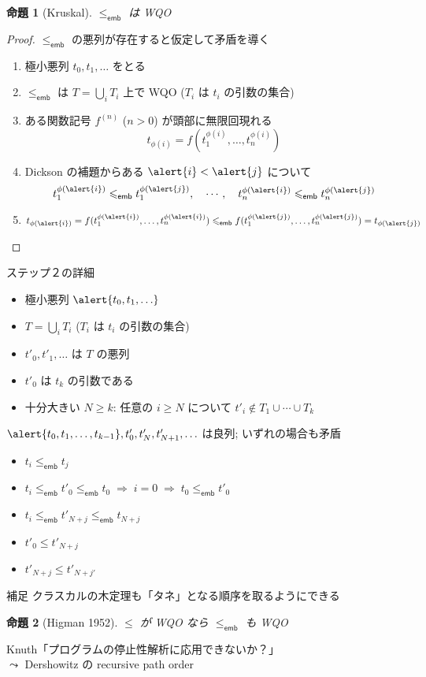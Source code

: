 \documentclass{beamer}
\newtheorem{prop}{命題}
\newcommand{\emb}{\mathsf{emb}}
\begin{document}
\begin{frame}
\begin{prop}[Kruskal]
$\leqslant_\emb$ は WQO
\end{prop}
\begin{proof}
$\leqslant_\emb$ の悪列が存在すると仮定して矛盾を導く
\begin{enumerate}
\itemsep 0.5em
\item 極小悪列 $t_0, t_1, \ldots$ をとる
\item 
\alert{$\leqslant_\emb$ は $T = \bigcup_i T_i$ 上で WQO} ($T_i$ は $t_i$ の引数の集合)

\item ある関数記号 $f^{(n)}$ ($n > 0$) が頭部に無限回現れる
\[
t_{\phi(i)} = f(t_{1}^{\phi(i)}, \ldots, t_{n}^{\phi(i)})
\]

\item Dickson の補題からある $\alert{i} < \alert{j}$ について
\[
t_{1}^{\phi(\alert{i})} \leqslant_\emb t_{1}^{\phi(\alert{j})},
\quad
\cdots,
\quad
t_{n}^{\phi(\alert{i})} \leqslant_\emb t_{n}^{\phi(\alert{j})}
\]

\item $t_{\phi(\alert{i})} = f(t_{1}^{\phi(\alert{i})}, \ldots, t_{n}^{\phi(\alert{i})}) \leqslant_\emb f(t_{1}^{\phi(\alert{j})}, \ldots, t_{n}^{\phi(\alert{j})}) = t_{\phi(\alert{j})}$ \lightning
\end{enumerate}
\end{proof}
\end{frame}

\begin{frame}{ステップ２の詳細}
\begin{itemize}
    \item 極小悪列 $\alert{t_0, t_1, \ldots}$
    \item $T = \bigcup_i T_i$ ($T_i$ は $t_i$ の引数の集合)
    \item $t'_0, t'_1, \ldots$ は $T$ の悪列
    \item $t'_0$ は $t_k$ の引数である
    \item 十分大きい $N \geqslant k$: 任意の $i \geqslant N$ について $t'_i \notin T_1 \cup \cdots \cup T_k$ 
\end{itemize}
\vfill
$\alert{t_0, t_1, \ldots, t_{k-1}}, t'_0, t'_{N}, t'_{N+1}, \ldots$ は良列; いずれの場合も矛盾 \lightning
\begin{itemize}
\itemsep 0.5em
\item $t_i \leqslant_\emb t_j$ \lightning
\item $t_i \leqslant_\emb t'_0 \leqslant_\emb t_0 \;  \Longrightarrow \; i = 0 \; \Longrightarrow \; t_0 \leqslant_\emb t'_0$  \lightning
\item $t_i \leqslant_\emb t'_{N+j} \leqslant_\emb t_{N+j}$ \lightning
\item $t'_0 \leqslant t'_{N+j} $ \lightning
\item $t'_{N+j} \leqslant t'_{N+j'} $ \lightning
\end{itemize}
\end{frame}

\begin{frame}{補足}
クラスカルの木定理も「タネ」となる順序を取るようにできる
\begin{prop}[Higman 1952]
$\leqslant$ が WQO なら $\leqslant_\emb$ も WQO
\end{prop}
\vfill
Knuth「プログラムの停止性解析に応用できないか？」\\
\pause
$\leadsto$ Dershowitz の recursive path order
\end{frame}
\end{document}
